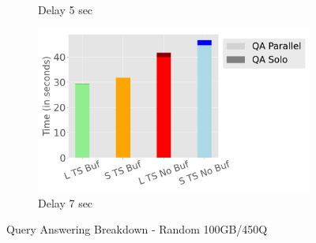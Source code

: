 \begin{figure}
\begin{subfigure}[c]{0.45\textwidth}
		\caption{Delay 5 sec}
		\label{fig:query-answering-breakdown-5}
	\end{subfigure}
	\begin{subfigure}[c]{0.45\textwidth}
		\includegraphics[width=1\textwidth]   {figures/Experiments/Dynamic/Breakdown/dataset_104857600_lockfree_Messi_Results_query_answering_breakdown_10485760_7.png}
		\caption{Delay 7 sec}
		\label{fig:query-answering-breakdown-7}
	\end{subfigure}
	\caption{Query Answering Breakdown - Random 100GB/450Q}
	\label{query-answering-breakdown-random}
\end{figure}

\clearpage
